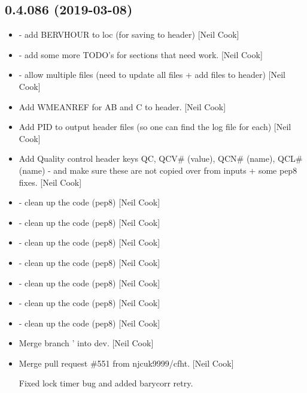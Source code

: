 \documentclass[a4paper,10pt,english]{report}
\begin{document}
\subsection{0.4.086 (2019-03-08)}
\label{\detokenize{misc/changelog:id174}}\begin{itemize}
\item {} 
 - add BERVHOUR to loc (for saving to header) {[}Neil Cook{]}

\item {} 
 - add some more TODO’s for sections that
need work. {[}Neil Cook{]}

\item {} 
 - allow multiple files (need to update all files + add files to
header) {[}Neil Cook{]}

\item {} 
Add WMEANREF for AB and C to header. {[}Neil Cook{]}

\item {} 
Add PID to output header files (so one can find the log file for each)
{[}Neil Cook{]}

\item {} 
Add Quality control header keys QC, QCV\# (value), QCN\# (name), QCL\#
(name) - and make sure these are not copied over from inputs + some
pep8 fixes. {[}Neil Cook{]}

\item {} 
 - clean up the code (pep8) {[}Neil Cook{]}

\item {} 
 - clean up the code (pep8) {[}Neil Cook{]}

\item {} 
 - clean up the code (pep8) {[}Neil Cook{]}

\item {} 
 - clean up the code (pep8) {[}Neil Cook{]}

\item {} 
 - clean up the code (pep8) {[}Neil Cook{]}

\item {} 
 - clean up the code (pep8) {[}Neil Cook{]}

\item {} 
 - clean up the code (pep8) {[}Neil Cook{]}

\item {} 
Merge branch ’ into dev. {[}Neil Cook{]}

\item {} 
Merge pull request \#551 from njcuk9999/cfht. {[}Neil Cook{]}

Fixed lock timer bug and added barycorr retry.

\end{itemize}
\end{document}
